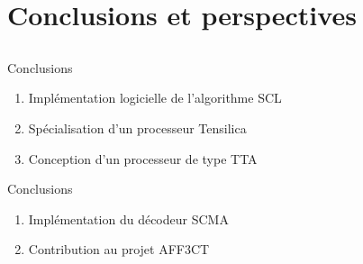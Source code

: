 \section{Conclusions et perspectives}
\subsection*{}

\begin{frame}[c]{Conclusions}

  \begin{enumerate}
\renewcommand{\section}[2]{} %

    \renewcommand*{\bibfont}{\scriptsize}
    \nocite{leonardon_fast_2017,ghaffari_improving_2017,leonardon_tta_2018,Ghaffari2018,cassagne_fast_2017,cassagne_gdr_2017}
    \vfill
    \item<+-> Implémentation logicielle de l'algorithme  SCL
    \scriptsize{\printbibliography[keyword={fast-scl}]}
    \vfill
    \item<+-> Spécialisation d'un processeur Tensilica
    \scriptsize{\printbibliography[keyword={leonardon}]}
    \vfill
    \item<+-> Conception d'un processeur de type TTA
    \scriptsize{\printbibliography[keyword={tta}]}
    \vfill
  \end{enumerate}

\end{frame}

\begin{frame}[c]{Conclusions}

  \begin{enumerate}
\renewcommand{\section}[2]{} %

    \renewcommand*{\bibfont}{\scriptsize}
    \nocite{leonardon_fast_2017,ghaffari_improving_2017,leonardon_tta_2018,Ghaffari2018,cassagne_fast_2017,cassagne_gdr_2017}
    \vfill
    \item<+-> Implémentation du décodeur SCMA
    \printbibliography[keyword={ghaffari}]
    \vfill
    \item<+-> Contribution au projet AFF3CT
    \printbibliography[keyword={aff3ct}]
    \vfill
  \end{enumerate}

\end{frame}

